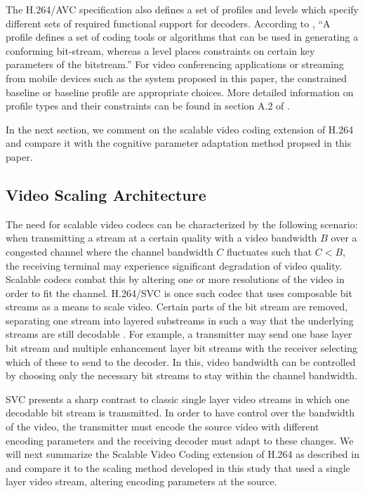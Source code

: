The H.264/AVC specification also defines a set of profiles and levels which specify different sets of required functional support for decoders. According to \cite{H264AVCOverview}, ``A profile defines a set of coding tools or algorithms that can be used in generating a conforming bit-stream, whereas a level places constraints on certain key parameters of the bitstream.'' For video conferencing applications or streaming from mobile devices such as the system proposed in this paper, the constrained baseline or baseline profile are appropriate choices. More detailed information on profile types and their constraints can be found in section A.2 of \cite{H264Spec}.

In the next section, we comment on the scalable video coding extension of H.264 and compare it with the cognitive parameter adaptation method propsed in this paper.


\subsection{Video Scaling Architecture}
\label{sec:SVC}

The need for scalable video codecs can be characterized by the following scenario: when transmitting a stream at a certain quality with a video bandwidth $B$ over a congested channel where the channel bandwidth $C$ fluctuates such that $C < B$, the receiving terminal may experience significant degradation of video quality. Scalable codecs combat this by altering one or more resolutions of the video in order to fit the channel. H.264/SVC is once such codec that uses composable bit streams as a means to scale video. Certain parts of the bit stream are removed, separating one stream into layered substreams in such a way that the underlying streams are still decodable \cite{SVCOverview}. For example, a transmitter may send one base layer bit stream and multiple enhancement layer bit streams with the receiver selecting which of these to send to the decoder. In this, video bandwidth can be controlled by choosing only the necessary bit streams to stay within the channel bandwidth. 

SVC presents a sharp contrast to classic single layer video streams in which one decodable bit stream is transmitted. In order to have control over the bandwidth of the video, the transmitter must encode the source video with different encoding parameters and the receiving decoder must adapt to these changes. We will next summarize the Scalable Video Coding extension of H.264 as described in \cite{SVCOverview} and compare it to the scaling method developed in this study that used a single layer video stream, altering encoding parameters at the source. 

